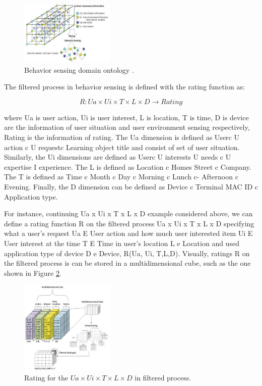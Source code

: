 \documentclass[journal]{vgtc}                %
\begin{document}
  \begin{figure}[htb]
    \centering
    \includegraphics[width=0.4\textwidth]{behaviour-sensing}
    \caption{Behavior sensing domain ontology \cite{Kim2013}.}
    \label{behaviour-sensing}
  \end{figure}

  The filtered process in behavior sensing is defined with the rating function as:

  \begin{equation}
    R: Ua \times Ui \times T \times L \times D \rightarrow Rating
  \end{equation}

  where Ua is user action, Ui is user interest, L is location, T is time, D is device are the information of user situation  and user environment sensing respectively, Rating is the  information of rating. The Ua dimension is defined as Userc U action c U requestc Learning object title and consist of set of user situation. Similarly, the Ui dimensions are defined as Userc U interests U needs c U expertise I experience. The L is defined as Location c Homes Street c Company. The T is defined as Time c Month c Day c Morning c Lunch c- Afternoon c Evening. Finally, the D dimension can be defined as Device c Terminal MAC ID c Application type.

  For instance, continuing Ua x Ui x T x L x D example considered above, we can define a rating function R on the filtered process Ua x Ui x T x L x D specifying what a user's request Ua E User action and how much user interested item Ui E User interest at the time T E Time in user's location L e Location and used application type of device D e Device, R(Ua, Ui, T,L,D). Visually, ratings R on the filtered process is can be stored in a multidimensional cube, such as the one shown in Figure \ref{rating}.

  \begin{figure}[htb]
    \centering
    \includegraphics[width=0.4\textwidth]{rating}
    \caption{Rating for the $Ua \times Ui \times T \times L \times D$ in filtered process\cite{Kim2013}.}
    \label{rating}
  \end{figure}
\end{document}

